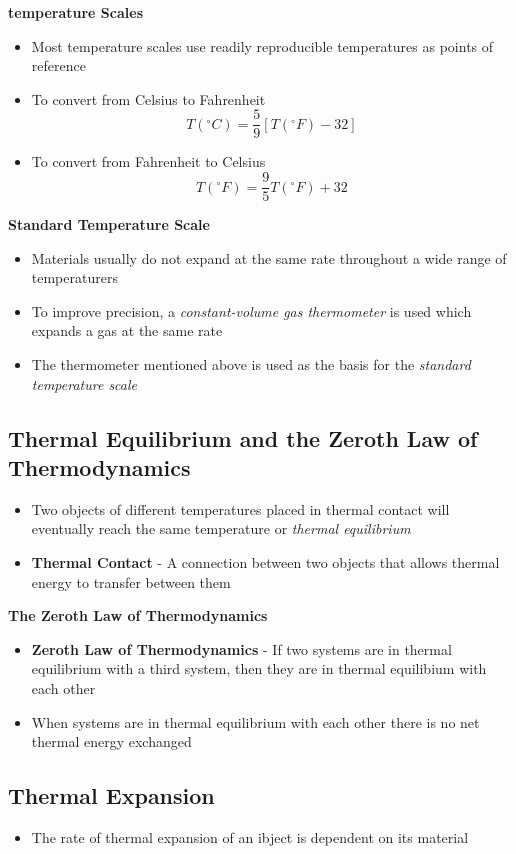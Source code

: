 \textbf{temperature Scales}
\begin{itemize}
    \item Most temperature scales use readily reproducible temperatures as points of reference
    \item To convert from Celsius to Fahrenheit
    \[T(^\circ C)=\frac{5}{9}[T(^\circ F)-32]\]
    \item To convert from Fahrenheit to Celsius \[T(^\circ F)=\frac{9}{5}T(^\circ F)+32\]
\end{itemize}

\textbf{Standard Temperature Scale}
\begin{itemize}
    \item Materials usually do not expand at the same rate throughout a wide range of temperaturers
    \item To improve precision, a \emph{constant-volume gas thermometer} is used which expands a gas at the same rate
    \item The thermometer mentioned above is used as the basis for the \emph{standard temperature scale}
\end{itemize}


\subsection{Thermal Equilibrium and the Zeroth Law of Thermodynamics}
\begin{itemize}
    \item Two objects of different temperatures placed in thermal contact will eventually reach the same temperature or \emph{thermal equilibrium}
    \item \textbf{Thermal Contact} - A connection between two objects that allows thermal energy to transfer between them
\end{itemize}

\textbf{The Zeroth Law of Thermodynamics}
\begin{itemize}
    \item \textbf{Zeroth Law of Thermodynamics} - If two systems are in thermal equilibrium with a third system, then they are in thermal equilibium with each other
    \item When systems are in thermal equilibrium with each other there is no net thermal energy exchanged
\end{itemize}

\subsection{Thermal Expansion}
\begin{itemize}
    \item The rate of thermal expansion of an ibject is dependent on its material
\end{itemize}

